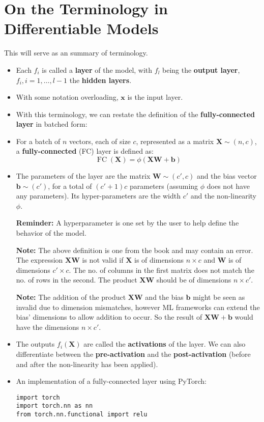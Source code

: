 \documentclass{article}
\newcommand{\tbf}[1]{\textbf{#1}}
\newcommand{\mbf}[1]{\mathbf{#1}}
\begin{document}
        \section*{\normalsize On the Terminology in Differentiable Models}
        This will serve as an summary of terminology.
        \begin{itemize}
            \item Each $f_i$ is called a \tbf{layer} of the model, with $f_l$ being the \tbf{output layer}, $f_i, i = 1, \hdots, l - 1$ the \tbf{hidden layers}.
            \item With some notation overloading, $\mbf{x}$ is the input layer.
            \item With this terminology, we can restate the definition of the \tbf{fully-connected layer} in batched form:
            \item For a batch of $n$ vectors, each of size $c$, represented as a matrix $\mbf{X} \sim (n, c)$, a \tbf{fully-connected} (FC) layer is defined as:
            \[\operatorname{FC}(\mbf{X}) = \phi (\mbf{XW + b})\]
            \item The parameters of the layer are the matrix $\mbf{W} \sim (c',c)$ and the bias vector $\mbf{b} \sim (c')$, for a total of $(c' + 1)c$ parameters (assuming $\phi$ does not have any parameters).
            Its hyper-parameters are the width $c'$ and the non-linearity $\phi$. 

            \tbf{Reminder:} A hyperparameter is one set by the user to help define the behavior of the model. 

            \tbf{Note:} The above definition is one from the book and may contain an error. The expression $\mbf{XW}$ is not valid if $\mbf{X}$ is of dimensions $n \times c$
            and $\mbf{W}$ is of dimensions $c' \times c$. The no. of columns in the first matrix does not match the no. of rows in the second. The product $\mbf{XW}$ should be of dimensions $n \times c'$.

            \tbf{Note:} The addition of the product $\mbf{XW}$ and the bias $\mbf{b}$ might be seen as invalid due to dimension mismatches, however ML frameworks can extend the bias' dimensions to allow addition to occur. 
            So the result of $\mbf{XW} + \mbf{b}$ would have the dimensions $n \times c'$.

            \item The outputs $f_i(\mbf{X})$ are called the \tbf{activations} of the layer. We can also differentiate between the \tbf{pre-activation} and the \tbf{post-activation} (before and after the non-linearity has been applied).
            \item An implementation of a fully-connected layer using PyTorch:
            \begin{lstlisting}
import torch
import torch.nn as nn
from torch.nn.functional import relu


\end{lstlisting}
\end{itemize}
\end{document}
